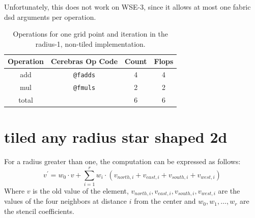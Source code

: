 Unfortunately, this does not work on WSE-3, since it allows at most one fabric \ac{dsd} arguments per operation.

\begin{table}[h]
    \centering
    \caption{Operations for one grid point and iteration in the radius-1, non-tiled implementation.}
    \label{tab:r1_non_tiled_operations}
    \begin{tabular}{@{}cccc@{}}
        \toprule
        Operation & Cerebras Op Code & Count & Flops \\
        \midrule
        add & \texttt{@fadds} & \num{4} & \num{4} \\
        mul & \texttt{@fmuls} & \num{2} & \num{2} \\
        \midrule
        total & & \num{6} & \num{6} \\
        \bottomrule
    \end{tabular}
\end{table}

\section{tiled any radius star shaped 2d}
For a radius greater than one, the computation can be expressed as follows:
\begin{equation}
    \label{eq:stencil_computation_tiled}
    v^{'} = w_0 \cdot v + \sum_{i=1}^{r} w_i \cdot (v_{north,i} + v_{east,i} + v_{south,i} + v_{west,i})
\end{equation}
Where $v$ is the old value of the element, $v_{north,i}, v_{east,i}, v_{south,i}, v_{west,i}$ are the values of the four neighbors at distance $i$ from the center and $w_0, w_1, \dots, w_r$ are the stencil coefficients.

